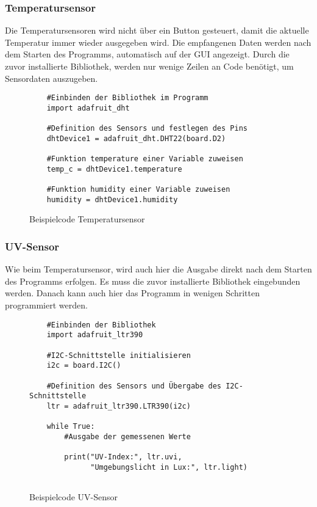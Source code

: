 \subsubsection{Temperatursensor}\label{sec:Testprogramm Temp}
\SecAuth{\nameSH}
Die Temperatursensoren wird nicht über ein Button gesteuert, damit die aktuelle Temperatur immer wieder ausgegeben wird. Die empfangenen Daten werden nach dem Starten des Programms, automatisch auf der GUI angezeigt. Durch die zuvor installierte Bibliothek, werden nur wenige Zeilen an Code benötigt, um Sensordaten auszugeben.
\begin{figure}[H]
    \centering
    \begin{verbatim}
    #Einbinden der Bibliothek im Programm
    import adafruit_dht
    
    #Definition des Sensors und festlegen des Pins
    dhtDevice1 = adafruit_dht.DHT22(board.D2)     

    #Funktion temperature einer Variable zuweisen
    temp_c = dhtDevice1.temperature                

    #Funktion humidity einer Variable zuweisen                             
    humidity = dhtDevice1.humidity 
    \end{verbatim}
    \caption{Beispielcode Temperatursensor}
\end{figure}

\newpage
\subsubsection{UV-Sensor}\label{sec:Testprogramm UV-Sensor}
Wie beim Temperatursensor, wird auch hier die Ausgabe direkt nach dem Starten des Programms erfolgen. Es muss die zuvor installierte Bibliothek eingebunden werden. Danach kann auch hier das Programm in wenigen Schritten programmiert werden.
\begin{figure}[H]
    \centering
    \begin{verbatim}
    #Einbinden der Bibliothek
    import adafruit_ltr390
    
    #I2C-Schnittstelle initialisieren
    i2c = board.I2C()

    #Definition des Sensors und Übergabe des I2C-Schnittstelle
    ltr = adafruit_ltr390.LTR390(i2c)

    while True:
        #Ausgabe der gemessenen Werte
        
        print("UV-Index:", ltr.uvi, 
              "Umgebungslicht in Lux:", ltr.light)
        
    \end{verbatim}
    \caption{Beispielcode UV-Sensor}
\end{figure}
\newpage
